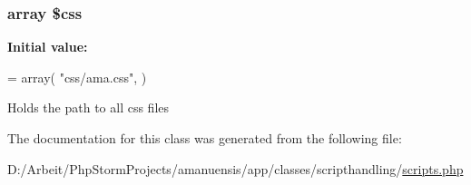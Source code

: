 \subsubsection[{\$css}]{\setlength{\rightskip}{0pt plus 5cm}array \$css\hspace{0.3cm}{\ttfamily [static]}}\label{class_scripts_ab2cede1cb181d8cd87d9a8f5570aa121}
{\bfseries Initial value\+:}
\begin{DoxyCode}
= array(
        \textcolor{stringliteral}{"css/ama.css"},
    )
\end{DoxyCode}
Holds the path to all css files 

The documentation for this class was generated from the following file\+:\begin{DoxyCompactItemize}
\item 
D\+:/\+Arbeit/\+Php\+Storm\+Projects/amanuensis/app/classes/scripthandling/\hyperlink{scripts_8php}{scripts.\+php}\end{DoxyCompactItemize}
